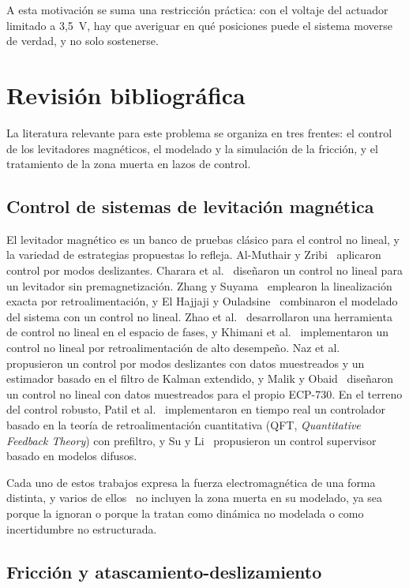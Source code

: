 A esta motivación se suma una restricción práctica: con el voltaje del actuador limitado a 3{,}5~V, hay que averiguar en qué posiciones puede el sistema moverse de verdad, y no solo sostenerse.

\section{Revisión bibliográfica}

La literatura relevante para este problema se organiza en tres frentes: el control de los levitadores magnéticos, el modelado y la simulación de la fricción, y el tratamiento de la zona muerta en lazos de control.

\subsection{Control de sistemas de levitación magnética}

El levitador magnético es un banco de pruebas clásico para el control no lineal, y la variedad de estrategias propuestas lo refleja. Al-Muthair y Zribi~\cite{al} aplicaron control por modos deslizantes. Charara et al.~\cite{charara} diseñaron un control no lineal para un levitador sin premagnetización. Zhang y Suyama~\cite{feifei} emplearon la linealización exacta por retroalimentación, y El Hajjaji y Ouladsine~\cite{el} combinaron el modelado del sistema con un control no lineal. Zhao et al.~\cite{zhao} desarrollaron una herramienta de control no lineal en el espacio de fases, y Khimani et al.~\cite{khimani} implementaron un control no lineal por retroalimentación de alto desempeño. Naz et al.~\cite{neelma} propusieron un control por modos deslizantes con datos muestreados y un estimador basado en el filtro de Kalman extendido, y Malik y Obaid~\cite{maaz} diseñaron un control no lineal con datos muestreados para el propio ECP-730. En el terreno del control robusto, Patil et al.~\cite{mukesh} implementaron en tiempo real un controlador basado en la teoría de retroalimentación cuantitativa (QFT, \emph{Quantitative Feedback Theory}) con prefiltro, y Su y Li~\cite{kuo1} propusieron un control supervisor basado en modelos difusos.

Cada uno de estos trabajos expresa la fuerza electromagnética de una forma distinta, y varios de ellos~\cite{khimani,mukesh,neelma} no incluyen la zona muerta en su modelado, ya sea porque la ignoran o porque la tratan como dinámica no modelada o como incertidumbre no estructurada.

\subsection{Fricción y atascamiento-deslizamiento}

